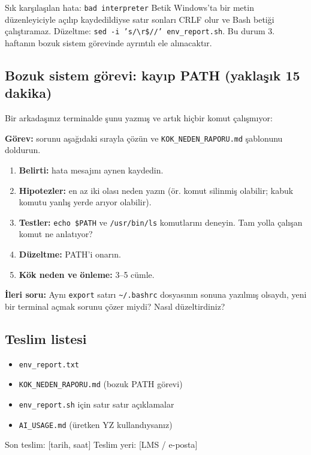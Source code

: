 \documentclass[11pt,a4paper]{article}
\begin{document}
\begin{uyari}{Sık karşılaşılan hata: \texttt{bad interpreter}}
Betik Windows'ta bir metin düzenleyiciyle açılıp kaydedildiyse satır sonları CRLF olur ve Bash betiği çalıştıramaz. Düzeltme: \texttt{sed -i 's/\textbackslash r\$//' env\_report.sh}. Bu durum 3. haftanın bozuk sistem görevinde ayrıntılı ele alınacaktır.
\end{uyari}

\subsection{Bozuk sistem görevi: kayıp PATH (yaklaşık 15 dakika)}
Bir arkadaşınız terminalde şunu yazmış ve artık hiçbir komut çalışmıyor:
\textbf{Görev:} sorunu aşağıdaki sırayla çözün ve \texttt{KOK\_NEDEN\_RAPORU.md} şablonunu doldurun.
\begin{enumerate}
  \item \textbf{Belirti:} hata mesajını aynen kaydedin.
  \item \textbf{Hipotezler:} en az iki olası neden yazın (ör. komut silinmiş olabilir; kabuk komutu yanlış yerde arıyor olabilir).
  \item \textbf{Testler:} \texttt{echo \$PATH} ve \texttt{/usr/bin/ls} komutlarını deneyin. Tam yolla çalışan komut ne anlatıyor?
  \item \textbf{Düzeltme:} PATH'i onarın.
  \item \textbf{Kök neden ve önleme:} 3--5 cümle.
\end{enumerate}
\textbf{İleri soru:} Aynı \texttt{export} satırı \texttt{\textasciitilde/.bashrc} dosyasının sonuna yazılmış olsaydı, yeni bir terminal açmak sorunu çözer miydi? Nasıl düzeltirdiniz?

\subsection{Teslim listesi}
\begin{itemize}
  \item \texttt{env\_report.txt}
  \item \texttt{KOK\_NEDEN\_RAPORU.md} (bozuk PATH görevi)
  \item \texttt{env\_report.sh} için satır satır açıklamalar
  \item \texttt{AI\_USAGE.md} (üretken YZ kullandıysanız)
\end{itemize}
Son teslim: [tarih, saat] \quad Teslim yeri: [LMS / e-posta]
\end{document}
